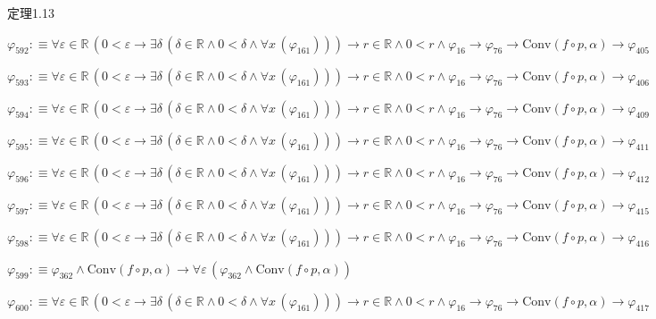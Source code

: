 \begin{fullproof}{定理1.13}
\begin{abbrevlist}
\item $\varphi_{592} :\equiv \forall \varepsilon \in \mathbb{R}\,(0 < \varepsilon \to \exists \delta\,(\delta \in \mathbb{R} \land 0 < \delta \land \forall x\,(\varphi_{161}))) \to r \in \mathbb{R} \land 0 < r \land \varphi_{16} \to \varphi_{76} \to \mathrm{Conv}(f \circ p,\alpha) \to \varphi_{405}$
\item $\varphi_{593} :\equiv \forall \varepsilon \in \mathbb{R}\,(0 < \varepsilon \to \exists \delta\,(\delta \in \mathbb{R} \land 0 < \delta \land \forall x\,(\varphi_{161}))) \to r \in \mathbb{R} \land 0 < r \land \varphi_{16} \to \varphi_{76} \to \mathrm{Conv}(f \circ p,\alpha) \to \varphi_{406}$
\item $\varphi_{594} :\equiv \forall \varepsilon \in \mathbb{R}\,(0 < \varepsilon \to \exists \delta\,(\delta \in \mathbb{R} \land 0 < \delta \land \forall x\,(\varphi_{161}))) \to r \in \mathbb{R} \land 0 < r \land \varphi_{16} \to \varphi_{76} \to \mathrm{Conv}(f \circ p,\alpha) \to \varphi_{409}$
\item $\varphi_{595} :\equiv \forall \varepsilon \in \mathbb{R}\,(0 < \varepsilon \to \exists \delta\,(\delta \in \mathbb{R} \land 0 < \delta \land \forall x\,(\varphi_{161}))) \to r \in \mathbb{R} \land 0 < r \land \varphi_{16} \to \varphi_{76} \to \mathrm{Conv}(f \circ p,\alpha) \to \varphi_{411}$
\item $\varphi_{596} :\equiv \forall \varepsilon \in \mathbb{R}\,(0 < \varepsilon \to \exists \delta\,(\delta \in \mathbb{R} \land 0 < \delta \land \forall x\,(\varphi_{161}))) \to r \in \mathbb{R} \land 0 < r \land \varphi_{16} \to \varphi_{76} \to \mathrm{Conv}(f \circ p,\alpha) \to \varphi_{412}$
\item $\varphi_{597} :\equiv \forall \varepsilon \in \mathbb{R}\,(0 < \varepsilon \to \exists \delta\,(\delta \in \mathbb{R} \land 0 < \delta \land \forall x\,(\varphi_{161}))) \to r \in \mathbb{R} \land 0 < r \land \varphi_{16} \to \varphi_{76} \to \mathrm{Conv}(f \circ p,\alpha) \to \varphi_{415}$
\item $\varphi_{598} :\equiv \forall \varepsilon \in \mathbb{R}\,(0 < \varepsilon \to \exists \delta\,(\delta \in \mathbb{R} \land 0 < \delta \land \forall x\,(\varphi_{161}))) \to r \in \mathbb{R} \land 0 < r \land \varphi_{16} \to \varphi_{76} \to \mathrm{Conv}(f \circ p,\alpha) \to \varphi_{416}$
\item $\varphi_{599} :\equiv \varphi_{362} \land \mathrm{Conv}(f \circ p,\alpha) \to \forall \varepsilon\,(\varphi_{362} \land \mathrm{Conv}(f \circ p,\alpha))$
\item $\varphi_{600} :\equiv \forall \varepsilon \in \mathbb{R}\,(0 < \varepsilon \to \exists \delta\,(\delta \in \mathbb{R} \land 0 < \delta \land \forall x\,(\varphi_{161}))) \to r \in \mathbb{R} \land 0 < r \land \varphi_{16} \to \varphi_{76} \to \mathrm{Conv}(f \circ p,\alpha) \to \varphi_{417}$

\end{abbrevlist}
\end{fullproof}
